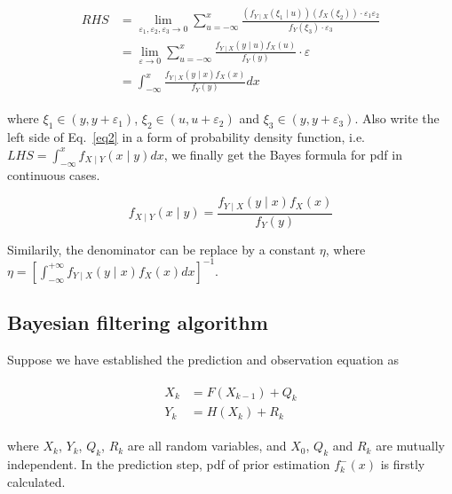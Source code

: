 \documentclass[conference]{IEEEtran}
\begin{document}
	\begin{equation}
	\begin{split}
	\begin{aligned}
	RHS&=\lim_{\varepsilon_{1}, \varepsilon_{2}, \varepsilon_{3} \rightarrow 0}\sum_{u=-\infty}^{x} \frac{(f_{Y\mid X}(\xi _{1}\mid u)) (f_{X}(\xi _{2}))\cdot \varepsilon_{1} \varepsilon_{2}}{f_{Y}
		(\xi _{3})\cdot \varepsilon_{3}}\\
	&=\lim_{\varepsilon \rightarrow 0}\sum_{u=-\infty}^{x}\frac{f_{Y\mid X}(y\mid u)f_{X}(u)}{f_{Y}(y)}\cdot \varepsilon\\ 
	&=\int_{-\infty}^{x}\frac{f_{Y\mid X}(y\mid x)f_{X}(x)}{f_{Y}(y)}dx
	\nonumber
	\end{aligned}
	\end{split}
	\end{equation}
	
	where $\xi _{1}\in (y,y+\varepsilon_{1})$, $\xi _{2}\in (u,u+\varepsilon_{2})$ and $\xi _{3}\in (y,y+\varepsilon_{3})$. Also write the left side of Eq.~\ref{eq2} in a form of probability density function, i.e. $LHS=\int_{-\infty}^{x}f_{X\mid Y}(x\mid y)dx$, we finally get the Bayes formula for pdf in continuous cases.
	
	\begin{equation}
		f_{X\mid Y}(x\mid y)=\frac{f_{Y\mid X}(y\mid x)f_{X}(x)}{f_{Y}(y)}
		\label{eq3}
	\end{equation}
	
	Similarily, the denominator can be replace by a constant $\eta$, where $\eta=[\int_{-\infty}^{+\infty}f_{Y\mid X}(y\mid x)f_{X}(x)dx]^{-1}$. 
	
	\subsection{Bayesian filtering algorithm}
	
	Suppose we have established the prediction and observation equation as
	
	\begin{equation}
	\begin{split}
	\begin{aligned}
	X_{k}&=F(X_{k-1})+Q_{k}\\
	Y_{k}&=H(X_{k})+R_{k}
	\label{eq4}
	\end{aligned}
	\end{split}
	\end{equation}
	
	where $X_{k}$, $Y_{k}$, $Q_{k}$, $R_{k}$ are all random variables, and $X_{0}$, $Q_{k}$ and $R_{k}$ are mutually independent. In the prediction step, pdf of prior estimation $f_{k}^{-}(x)$ is firstly calculated.
	
\end{document}
